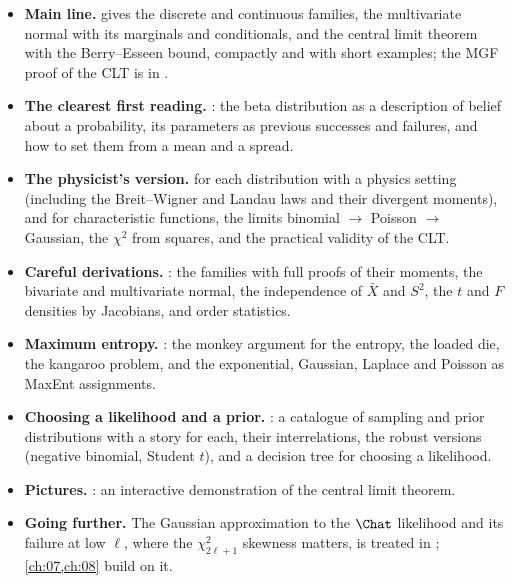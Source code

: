 \begin{itemize}[leftmargin=1.2em,itemsep=2pt]
  \item \textbf{Main line.}  gives the discrete and continuous families, the multivariate normal with its marginals and conditionals, and the central limit theorem with the Berry--Esseen bound, compactly and with short examples; the MGF proof of the CLT is in .
  \item \textbf{The clearest first reading.} : the beta distribution as a description of belief about a probability, its parameters as previous successes and failures, and how to set them from a mean and a spread.
  \item \textbf{The physicist's version.}  for each distribution with a physics setting (including the Breit--Wigner and Landau laws and their divergent moments), and  for characteristic functions, the limits binomial $\to$ Poisson $\to$ Gaussian, the $\chi^2$ from squares, and the practical validity of the CLT.
  \item \textbf{Careful derivations.} : the families with full proofs of their moments, the bivariate and multivariate normal, the independence of $\bar X$ and $S^2$, the $t$ and $F$ densities by Jacobians, and order statistics.
  \item \textbf{Maximum entropy.} : the monkey argument for the entropy, the loaded die, the kangaroo problem, and the exponential, Gaussian, Laplace and Poisson as MaxEnt assignments.
  \item \textbf{Choosing a likelihood and a prior.} : a catalogue of sampling and prior distributions with a story for each, their interrelations, the robust versions (negative binomial, Student $t$), and a decision tree for choosing a likelihood.
  \item \textbf{Pictures.} : an interactive demonstration of the central limit theorem.
  \item \textbf{Going further.} The Gaussian approximation to the $\Chat$ likelihood and its failure at low $\ell$, where the $\chi^2_{2\ell+1}$ skewness matters, is treated in \cite{HamimecheLewis2008}; \cref{ch:07,ch:08} build on it.
\end{itemize}
  